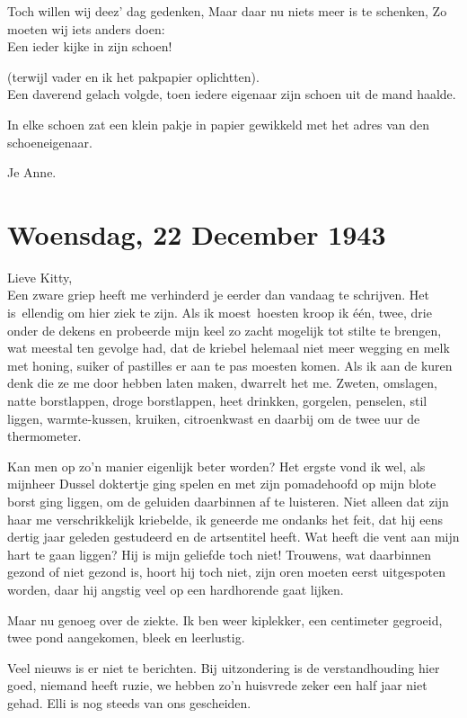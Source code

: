 \documentclass{book}
\begin{document}
Toch willen wij deez' dag gedenken, Maar daar nu niets meer is te
schenken, Zo moeten wij iets anders doen:\\Een ieder kijke in zijn
schoen!

(terwijl vader en ik het pakpapier oplichtten).\\Een daverend gelach
volgde, toen iedere eigenaar zijn schoen uit de mand haalde.

In elke schoen zat een klein pakje in papier gewikkeld met het adres van
den schoeneigenaar.

Je Anne.

\chapter{Woensdag, 22 December 1943}

Lieve Kitty,\\Een zware griep heeft me verhinderd je eerder dan vandaag
te schrijven. Het is~ellendig om hier ziek te zijn. Als ik moest~hoesten
kroop ik één, twee, drie onder de dekens en probeerde mijn keel zo zacht
mogelijk tot stilte te brengen, wat meestal ten gevolge had, dat de
kriebel helemaal niet meer wegging en melk met honing, suiker of
pastilles er aan te pas moesten komen. Als ik aan de kuren denk die ze
me door hebben laten maken, dwarrelt het me. Zweten, omslagen, natte
borstlappen, droge borstlappen, heet drinkken, gorgelen, penselen, stil
liggen, warmte-kussen, kruiken, citroenkwast en daarbij om de twee uur
de thermometer.

Kan men op zo'n manier eigenlijk beter worden? Het ergste vond ik wel,
als mijnheer Dussel doktertje ging spelen en met zijn pomadehoofd op
mijn blote borst ging liggen, om de geluiden daarbinnen af te luisteren.
Niet alleen dat zijn haar me verschrikkelijk kriebelde, ik geneerde me
ondanks het feit, dat hij eens dertig jaar geleden gestudeerd en de
artsentitel heeft. Wat heeft die vent aan mijn hart te gaan liggen? Hij
is mijn geliefde toch niet! Trouwens, wat daarbinnen gezond of niet
gezond is, hoort hij toch niet, zijn oren moeten eerst uitgespoten
worden, daar hij angstig veel op een hardhorende gaat lijken.

Maar nu genoeg over de ziekte. Ik ben weer kiplekker, een centimeter
gegroeid, twee pond aangekomen, bleek en leerlustig.

Veel nieuws is er niet te berichten. Bij uitzondering is de
verstandhouding hier goed, niemand heeft ruzie, we hebben zo'n huisvrede
zeker een half jaar niet gehad. Elli is nog steeds van ons gescheiden.
\end{document}
